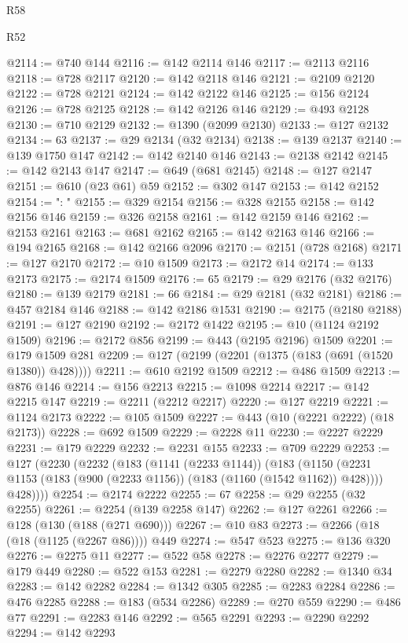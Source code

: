 \begin{lexlean}{R58}
\begin{lexlean}{R52}
\begin{coremodule}
{{{{{{{{{{{{{{{{{{{{{{{{{{{{{{{{{{{{{{{{{{{{{{{{{{{{{{{{{{{{{{{{{{{{{{{{{{{{{{{{{{{{{{{{{{{{{{{{{{{{{{{{{{{{{{{{{{{{{{{{{{{{{{{{{{{{{{{{{{{{{{{{{{{{{{{{{{{{{{{{{{{{{{{{{{{{{{{{{{{{{{{{{{{{{{{{{{{{{{@2114 := @740 @144
@2116 := @142 @2114 @146
@2117 := @2113 @2116
@2118 := @728 @2117
@2120 := @142 @2118 @146
@2121 := @2109 @2120
@2122 := @728 @2121
@2124 := @142 @2122 @146
@2125 := @156 @2124
@2126 := @728 @2125
@2128 := @142 @2126 @146
@2129 := @493 @2128
@2130 := @710 @2129
@2132 := @1390 (@2099 @2130)
@2133 := @127 @2132
@2134 := 63
@2137 := @29 @2134 (@32 @2134)
@2138 := @139 @2137
@2140 := @139 @1750 @147
@2142 := @142 @2140 @146
@2143 := @2138 @2142
@2145 := @142 @2143 @147
@2147 := @649 (@681 @2145)
@2148 := @127 @2147
@2151 := @610 (@23 @61) @59
@2152 := @302 @147
@2153 := @142 @2152
@2154 := ": "
@2155 := @329 @2154
@2156 := @328 @2155
@2158 := @142 @2156 @146
@2159 := @326 @2158
@2161 := @142 @2159 @146
@2162 := @2153 @2161
@2163 := @681 @2162
@2165 := @142 @2163 @146
@2166 := @194 @2165
@2168 := @142 @2166 @2096
@2170 := @2151 (@728 @2168)
@2171 := @127 @2170
@2172 := @10 @1509
@2173 := @2172 @14
@2174 := @133 @2173
@2175 := @2174 @1509
@2176 := 65
@2179 := @29 @2176 (@32 @2176)
@2180 := @139 @2179
@2181 := 66
@2184 := @29 @2181 (@32 @2181)
@2186 := @457 @2184 @146
@2188 := @142 @2186 @1531
@2190 := @2175 (@2180 @2188)
@2191 := @127 @2190
@2192 := @2172 @1422
@2195 := @10 (@1124 @2192 @1509)
@2196 := @2172 @856
@2199 := @443 (@2195 @2196) @1509
@2201 := @179 @1509 @281
@2209 := @127 (@2199 (@2201 (@1375 (@183 (@691 (@1520 @1380)) @428))))
@2211 := @610 @2192 @1509
@2212 := @486 @1509
@2213 := @876 @146
@2214 := @156 @2213
@2215 := @1098 @2214
@2217 := @142 @2215 @147
@2219 := @2211 (@2212 @2217)
@2220 := @127 @2219
@2221 := @1124 @2173
@2222 := @105 @1509
@2227 := @443 (@10 (@2221 @2222) (@18 @2173))
@2228 := @692 @1509
@2229 := @2228 @11
@2230 := @2227 @2229
@2231 := @179 @2229
@2232 := @2231 @155
@2233 := @709 @2229
@2253 := @127
    (@2230
      (@2232
        (@183
          (@1141 (@2233 @1144))
          (@183
            (@1150 (@2231 @1153 (@183 (@900 (@2233 @1156)) (@183 (@1160 (@1542 @1162)) @428))))
            @428))))
@2254 := @2174 @2222
@2255 := 67
@2258 := @29 @2255 (@32 @2255)
@2261 := @2254 (@139 @2258 @147)
@2262 := @127 @2261
@2266 := @128 (@130 (@188 (@271 @690)))
@2267 := @10 @83
@2273 := @2266 (@18 (@18 (@1125 (@2267 @86)))) @449
@2274 := @547 @523
@2275 := @136 @320
@2276 := @2275 @11
@2277 := @522 @58
@2278 := @2276 @2277
@2279 := @179 @449
@2280 := @522 @153
@2281 := @2279 @2280
@2282 := @1340 @34
@2283 := @142 @2282
@2284 := @1342 @305
@2285 := @2283 @2284
@2286 := @476 @2285
@2288 := @183 (@534 @2286)
@2289 := @270 @559
@2290 := @486 @77
@2291 := @2283 @146
@2292 := @565 @2291
@2293 := @2290 @2292
@2294 := @142 @2293
}}}}}}}}}}}}}}}}}}}}}}}}}}}}}}}}}}}}}}}}}}}}}}}}}}}}}}}}}}}}}}}}}}}}}}}}}}}}}}}}}}}}}}}}}}}}}}}}}}}}}}}}}}}}}}}}}}}}}}}}}}}}}}}}}}}}}}}}}}}}}}}}}}}}}}}}}}}}}}}}}}}}}}}}}}}}}}}}}}}}}}}}}}}}}}}}}}}}}}
\end{coremodule}
\end{lexlean}
\end{lexlean}
